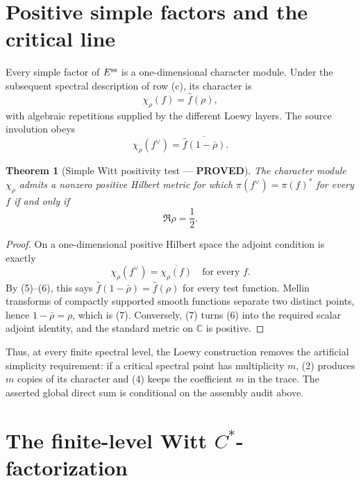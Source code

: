 \documentclass[11pt]{article}
\newcommand{\PROVED}{\textcolor{green!40!black}{\textbf{PROVED}}}
\newtheorem{theorem}{Theorem}
\begin{document}
\section{Positive simple factors and the critical line}

Every simple factor of $E^{\rm ss}$ is a one-dimensional character module.
Under the subsequent spectral description of row (c), its character is
\begin{equation}
       \chi_\rho(f)=\widehat f(\rho),                \tag{5}
\end{equation}
with algebraic repetitions supplied by the different Loewy layers.
The source involution obeys
\begin{equation}
 \chi_\rho(f^\vee)
 =\overline{\widehat f(1-\overline\rho)}.            \tag{6}
\end{equation}

\begin{theorem}[Simple Witt positivity test --- \PROVED]
The character module $\chi_\rho$ admits a nonzero positive Hilbert metric
for which $\pi(f^\vee)=\pi(f)^*$ for every $f$ if and only if
\begin{equation}
                       \Re\rho=\frac12.              \tag{7}
\end{equation}
\end{theorem}

\begin{proof}
On a one-dimensional positive Hilbert space the adjoint condition is
exactly
\[
 \chi_\rho(f^\vee)=\overline{\chi_\rho(f)}
 \quad\text{for every }f.
\]
By (5)--(6), this says
$\widehat f(1-\bar\rho)=\widehat f(\rho)$ for every test function.
Mellin transforms of compactly supported smooth functions separate two
distinct points, hence $1-\bar\rho=\rho$, which is (7).  Conversely, (7)
turns (6) into the required scalar adjoint identity, and the standard
metric on $\mathbb C$ is positive.
\end{proof}

Thus, at every finite spectral level, the Loewy construction removes the
artificial simplicity requirement: if a critical spectral point has
multiplicity $m$, (2) produces $m$ copies of its character and (4) keeps
the coefficient $m$ in the trace.  The asserted global direct sum is
conditional on the assembly audit above.

\section{The finite-level Witt $C^*$-factorization}
\end{document}
